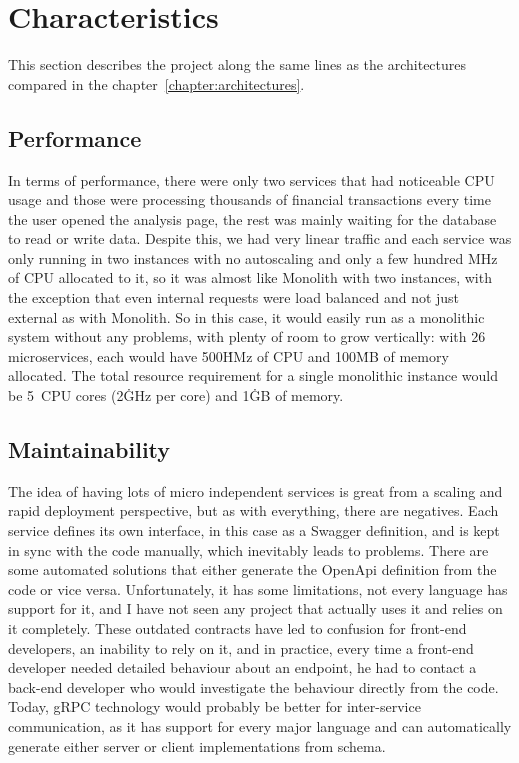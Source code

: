 \section{Characteristics}
This section describes the project along the same lines as the architectures compared in the
chapter~\ref{chapter:architectures}.

\subsection{Performance}
In terms of performance, there were only two services that had noticeable CPU usage and those were processing thousands of financial transactions every time the user opened the analysis page, the rest was mainly waiting for the database to read or write data. Despite this, we had very linear traffic and each service was only running in two instances with no autoscaling and only a few hundred MHz of CPU allocated to it, so it was almost like Monolith with two instances, with the exception that even internal requests were load balanced and not just external as with Monolith. So in this case, it would easily run as a monolithic system without any problems, with plenty of room to grow vertically: with 26 microservices, each would have 500\.HMz of CPU and 100\.MB of memory allocated. The total resource requirement for a single monolithic instance would be 5~CPU cores (2\.GHz per core) and 1\.GB of memory.

\subsection{Maintainability}
The idea of having lots of micro independent services is great from a scaling and rapid deployment perspective, but as with everything, there are negatives. Each service defines its own interface, in this case as a Swagger definition, and is kept in sync with the code manually, which inevitably leads to problems. There are some automated solutions that either generate the OpenApi definition from the code or vice versa. Unfortunately, it has some limitations, not every language has support for it, and I have not seen any project that actually uses it and relies on it completely. These outdated contracts have led to confusion for front-end developers, an inability to rely on it, and in practice, every time a front-end developer needed detailed behaviour about an endpoint, he had to contact a back-end developer who would investigate the behaviour directly from the code. Today, gRPC technology would probably be better for inter-service communication, as it has support for every major language and can automatically generate either server or client implementations from schema.


